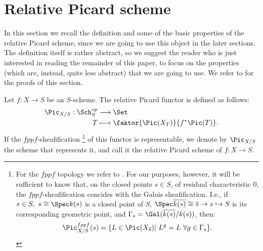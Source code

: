 %
%
%

\section{Relative Picard scheme}

In this section we recall the definition and some of the basic properties of the relative Picard scheme, since we are going to use this object in the later sections. The definition itself is rather abstract, so we suggest the reader who is just interested in reading the remainder of this paper, to focus on the properties (which are, instead, quite less abstract) that we are going to use. We refer to \cite{kleiman} for the proofs of this section.

\begin{definition}\label{relativepicard}
	Let $f:X \rightarrow S$ be an $S$-scheme. The relative Picard functor is defined as follows:
	\begin{align*}
		\Pic_{X/S}: \Sch_S^{op} &\longrightarrow \Set \\
		T &\longmapsto \faktor{\Pic(X_T)}{f^*\Pic(T)}.
	\end{align*}
	If the $fppf$-sheafification \footnote{For the $fppf$ topology we refer to \cite[Tag 021L]{stacks-project}. For our purposes, however, it will be sufficient to know that, on the closed points $s \in S$, of residual characteristic $0$, the $fppf$-sheafification concides with the Galois sheafification. I.e., if $s \in S, \ s \cong \Spec k(s)$ is a closed point of $S$, $\Spec \overline{k(s)} \cong \overline{s} \rightarrow s \hookrightarrow S$ is its corresponding geometric point, and $\Gamma_s=\Gal (\overline{k(s)}/k(s))$, then:
	\[
	\Pic^{fppf}_{X/S}(s)=\{L \in \Pic(X_{\overline{s}}) | \  L^g=L \  \forall g \in \Gamma_s\}.
	\]
} of this functor is representable, we denote by $\Pic_{X/S}$ the scheme that represents it, and call it the relative Picard scheme of $f:X\rightarrow S$.
\end{definition}

